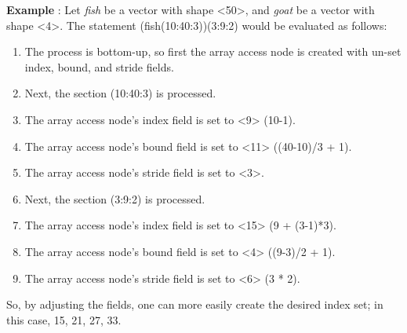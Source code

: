   {\bf Example } : Let {\em fish }  be a vector with shape <50>, and {\em 
  goat }  be a vector with shape <4>.
  The statement (fish(10:40:3))(3:9:2) would be evaluated as follows:
  \begin{enumerate}
  \item The process is bottom-up, so first the array access node is
  created with un-set index, bound, and stride fields.
  \item Next, the section (10:40:3) is processed.
  \item The array access node's index field is set to <9> (10-1).
  \item The array access node's bound field is set to <11> ((40-10)/3 + 1).
  \item The array access node's stride field is set to <3>.
  \item Next, the section (3:9:2) is processed.
  \item The array access node's index field is set to <15> (9 + (3-1)*3).
  \item The array access node's bound field is set to <4> ((9-3)/2 + 1).
  \item The array access node's stride field is set to <6> (3 * 2).
  \end{enumerate}
  So, by adjusting the fields, one can more easily create the desired index
  set; in this case, {15, 21, 27, 33}.\\ \\



